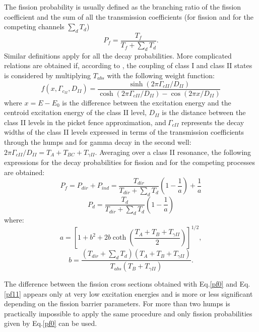 \documentclass[twocolumn,amsmath,amssymb,10pt,groupedaddress,letter]{revtex4}
\begin{document}
The fission probability is usually defined as the branching ratio of the fission coefficient
and the sum of all the transmission coefficients (for fission and for the competing channels
$\sum_dT_d$)
%
\begin{equation}
P_{f}=\frac{T_{f}}{T_{f}+\sum_{d}T_{d}}.
\label{pf0}%
\end{equation}
%
Similar definitions apply for all the decay probabilities.
More complicated relations are obtained if, according to \cite{Back:74},
the coupling of class I and class II states is considered by multiplying $T_{abs}$ with the
following weight function:%
%
\begin{equation}
f(x,\Gamma_{c_{II}},D_{II})=\frac{\sinh(2\pi\Gamma_{cII}/D_{II})}{\cosh
(2\pi\Gamma_{cII}/D_{II})-\cos(2\pi x/D_{II})}%
\end{equation}
%
where $x=E-E_{0}$ is the difference between the excitation energy and the
centroid excitation energy of the class II level, $D_{II}$ is the distance
between the class II levels in the picket fence approximation, and$\ \Gamma
_{cII}$ represents the decay widths of the class II levels expressed in terms
of the transmission coefficients through the humps and for gamma decay in the
second well:\ $2\pi\Gamma_{cII}/D_{II}=T_{A}+T_{BC}+T_{\gamma II}.$
Averaging over a class II resonance, the following expressions for the decay
probabilities for fission and for the competing processes
are obtained:%
%
\begin{equation}
P_{f}=P_{dir}+P_{ind}=\frac{T_{dir}}{T_{dir}+\sum_{d}T_{d}}\left(  1-\frac
{1}{a}\right)  +\frac{1}{a}\label{pf11}%
\end{equation}
%
%
\begin{equation}
P_{d}=\frac{T_{d}}{T_{dir}+\sum_{d}T_{d}}\left(  1-\frac{1}{a}\right)  \label{pd}%
\end{equation}
%
where:
\begin{equation}
a=\left[  1+b^{2}+2b\coth\left(  \frac{T_{A}+T_{B}+T_{\gamma II}}{2}\right)
\right]  ^{1/2}, \label{a11}%
\end{equation}%
%
\begin{equation}
b=\frac{(T_{dir}+\sum_{d}T_{d})(T_{A}+T_{B}+T_{\gamma II})}{T_{abs}%
(T_{B}+T_{\gamma II})}. \label{b11}%
\end{equation}
%

The difference between the fission cross sections obtained with Eq.\ref{pf0} and
Eq.\ref{pf11} appears only at very low excitation energies and is more or less significant
depending on the fission barrier parameters. For more than two humps is practically
impossible to apply the same procedure and only fission probabilities given by Eq.\ref{pf0}
can be used.
\end{document}
